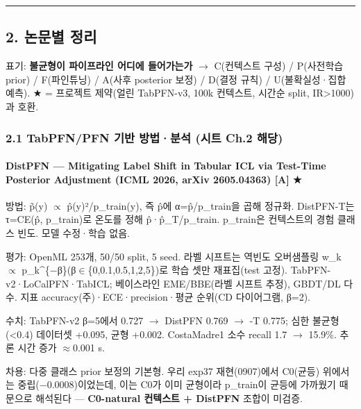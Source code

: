 \medskip\hrule\medskip
\subsection{2. 논문별 정리}
표기: \textbf{불균형이 파이프라인 어디에 들어가는가}  \ensuremath{\rightarrow}  C(컨텍스트 구성) /\allowbreak{} P(사전학습 prior) /\allowbreak{} F(파인튜닝) /\allowbreak{} A(사후 posterior 보정) /\allowbreak{} D(결정 규칙) /\allowbreak{} U(불확실성·집합 예측). ★ =\allowbreak{} 프로젝트 제약(얼린 TabPFN-v3, 100k 컨텍스트, 시간순 split, IR>1000)과 호환.

\subsubsection{2.1 TabPFN/\allowbreak{}PFN 기반 방법·분석 (시트 Ch.2 해당)}
\paragraph{DistPFN — Mitigating Label Shift in Tabular ICL via Test-Time Posterior Adjustment (ICML 2026, arXiv 2605.04363) [A] ★}
\par\noindent \textbullet\enspace 방법: p̃(y) \ensuremath{\propto} p̂(y)²/\allowbreak{}p\_\allowbreak{}train(y), 즉 p̂에 α=\allowbreak{}p̂/\allowbreak{}p\_\allowbreak{}train을 곱해 정규화. DistPFN-T는 τ=\allowbreak{}CE(p̂, p\_\allowbreak{}train)로 온도를 정해 p̂·p̂\_\allowbreak{}T/\allowbreak{}p\_\allowbreak{}train. p\_\allowbreak{}train은 컨텍스트의 경험 클래스 빈도. 모델 수정·학습 없음.


\par\noindent \textbullet\enspace 평가: OpenML 253개, 50/\allowbreak{}50 split, 5 seed. 라벨 시프트는 역빈도 오버샘플링 w\_\allowbreak{}k \ensuremath{\propto} p\_\allowbreak{}k\textasciicircum{}\{−β\}(β\ensuremath{\in}\{0,0.1,0.5,1,2,5\})로 학습 셋만 재표집(test 고정). TabPFN-v2·LoCalPFN·TabICL; 베이스라인 EME/\allowbreak{}BBE(라벨 시프트 추정), GBDT/\allowbreak{}DL 다수. 지표 accuracy(주)·ECE·precision·평균 순위(CD 다이어그램, β=\allowbreak{}2).


\par\noindent \textbullet\enspace 수치: TabPFN-v2 β=\allowbreak{}5에서 0.727  \ensuremath{\rightarrow}  DistPFN 0.769  \ensuremath{\rightarrow}  -T 0.775; 심한 불균형(<0.4) 데이터셋 +\allowbreak{}0.095, 균형 +\allowbreak{}0.002. CostaMadre1 소수 recall 1.7 \ensuremath{\rightarrow} 15.9\%. 추론 시간 증가 \ensuremath{\approx}0.001 s.


\par\noindent \textbullet\enspace 차용: 다중 클래스 prior 보정의 기본형. 우리 exp37 재현(0907)에서 C0(균등) 위에서는 중립(−0.0008)이었는데, 이는 C0가 이미 균형이라 p\_\allowbreak{}train이 균등에 가까웠기 때문으로 해석된다 — \textbf{C0-natural 컨텍스트 +\allowbreak{} DistPFN} 조합이 미검증.


